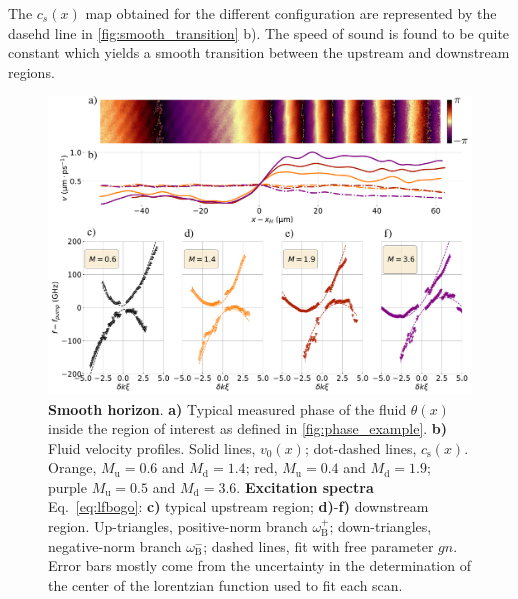 The $c_s(x)$ map obtained for the different configuration are represented by the dasehd line in \autoref{fig:smooth_transition} b). The speed of sound is found to be quite constant which yields a smooth transition between the upstream and downstream regions. 

\bigskip

\begin{figure}
    \centering
    \includegraphics[width=1\textwidth]{chap3_custom_st/fig/bh_smooth.pdf}
    \caption{\textbf{Smooth horizon}.
    \textbf{a)} Typical measured phase of the fluid $\theta(x)$ inside the region of interest as defined in \autoref{fig:phase_example}.
    \textbf{b)} Fluid velocity profiles.
    Solid lines, $v_0(x)$; dot-dashed lines, $c_\mathrm{s}(x)$. Orange, $M_\mathrm{u}=0.6$ and $M_\mathrm{d}=1.4$; red, $M_\mathrm{u}=0.4$ and $M_\mathrm{d}=1.9$; purple $M_\mathrm{u}=0.5$ and $M_\mathrm{d}=3.6$.
    \textbf{Excitation spectra} Eq.~\eqref{eq:lfbogo}: \textbf{c)} typical upstream region; \textbf{d)}-\textbf{f)} downstream region.
    Up-triangles, positive-norm branch $\omega_\mathrm{B}^+$; down-triangles, negative-norm branch $\omega_\mathrm{B}^-$; dashed lines, fit with free parameter $gn$. Error bars mostly come from the uncertainty in the determination
    of the center of the lorentzian function used to fit each scan.
    \label{fig:smooth_transition}}
\end{figure}




